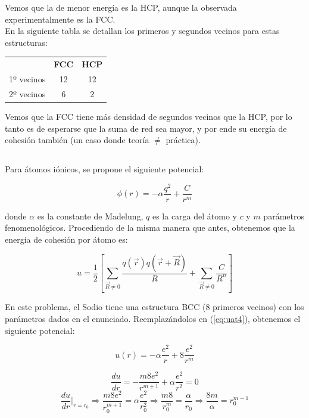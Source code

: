\documentclass[a4paper]{article}
\begin{document}
Vemos que la de menor energ\'ia es la HCP, aunque la observada experimentalmente es la FCC.\\

En la siguiente tabla se detallan los primeros y segundos vecinos para estas estructuras:\\

\begin{center}
\begin{tabular}{|ccc|}
\hline
	 & \textbf{FCC} & \textbf{HCP}\\
	1º vecinos & 12 & 12\\
	2º vecinos & 6 & 2\\
\hline
\end{tabular}
\end{center}

Vemos que la FCC tiene m\'as densidad de segundos vecinos que la HCP, por lo tanto es de esperarse que la suma de red sea mayor, y por ende su energ\'ia de cohesi\'on tambi\'en (un caso donde teor\'ia $\neq$ pr\'actica).

\subsection{}

Para \'atomos i\'onicos, se propone el siguiente potencial:

\begin{equation}
\label{eq:cb}
\phi(r) = -\alpha\frac{q^{2}}{r} + \frac{C}{r^{m}}
\end{equation}

donde $\alpha$ es la constante de Madelung, $q$ es la carga del \'atomo y $c$ y $m$ par\'ametros fenomenol\'ogicos. Procediendo de la misma manera que antes, obtenemos que la energ\'ia de cohesi\'on por \'atomo es:

\begin{equation}
\label{eq:uat4}
u = \frac{1}{2}\left[ \sum_{\vec{R} \neq 0} \frac{q(\vec{r})q(\vec{r} + \vec{R})}{R} + \sum_{\vec{R} \neq 0} \frac{C}{R^{n}} \right]
\end{equation}

En este problema, el Sodio tiene una estructura BCC (8 primeros vecinos) con los par\'ametros dados en el enunciado. Reemplaz\'andolos en (\ref{eq:uat4}), obtenemos el siguiente potencial:

$$u(r) = -\alpha \frac{e^{2}}{r} + 8\frac{e^{2}}{r^{m}}$$

$$\frac{du}{dr} = -\frac{m8e^{2}}{r^{m+1}} + \alpha \frac{e^{2}}{r^{2}} = 0$$
$$\frac{du}{dr}\bigg|_{r = r_{0}} \Rightarrow  \frac{m8e^{2}}{r_{0}^{m+1}} = \alpha \frac{e^{2}}{r_{0}^{2}} \Rightarrow \frac{m8}{r_{0}^{m}} = \frac{\alpha}{r_{0}} \Rightarrow \frac{8m}{\alpha} = r_{0}^{m - 1}$$
\\
\end{document}
